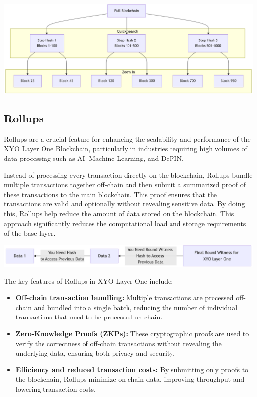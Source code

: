 \documentclass{article}
\begin{document}
\begin{center}
    \includegraphics[width=15cm]{step-hash.png}
\end{center}

\subsection{Rollups}
Rollups are a crucial feature for enhancing the scalability and performance of the XYO Layer One Blockchain, particularly in industries requiring high volumes of data processing such as AI, Machine Learning, and DePIN. 

Instead of processing every transaction directly on the blockchain, Rollups bundle multiple transactions together off-chain and then submit a summarized proof of these transactions to the main blockchain. This proof ensures that the transactions are valid and optionally without revealing sensitive data. By doing this, Rollups help reduce the amount of data stored on the blockchain. This approach significantly reduces the computational load and storage requirements of the base layer. 

\begin{center}
    \includegraphics[width=15cm]{rollup.png}
\end{center}

The key features of Rollups in XYO Layer One include: 
\begin{itemize}
    \item \textbf{Off-chain transaction bundling:} Multiple transactions are processed off-chain and bundled into a single batch, reducing the number of individual transactions that need to be processed on-chain.
    \item \textbf{Zero-Knowledge Proofs (ZKPs):} These cryptographic proofs are used to verify the correctness of off-chain transactions without revealing the underlying data, ensuring both privacy and security. 
    \item \textbf{Efficiency and reduced transaction costs:} By submitting only proofs to the blockchain, Rollups minimize on-chain data, improving throughput and lowering transaction costs.
\end{itemize}
\end{document}
